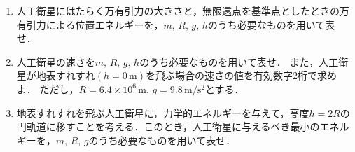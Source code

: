 \begin{enumerate}[（1）]
  \setlength{\leftskip}{-1zw}
  \setlength{\itemindent}{1zw}\setlength{\labelsep}{0.5zw}
  \setlength{\labelwidth}{1zw}\setlength{\leftmargin}{1zw}
  \setlength{\itemsep}{0.5\baselineskip}
  \addtocounter{enumi}{3}
  \item 人工衛星にはたらく万有引力の大きさと，無限遠点を基準点としたときの万有引力による位置エネルギーを，$m,\,R,\,g,\,h$のうち必要なものを用いて表せ．
  \item 人工衛星の速さを$m,\,R,\,g,\,h$のうち必要なものを用いて表せ．
  また，人工衛星が地表すれすれ$(h=0\,\text{m})$を飛ぶ場合の速さの値を有効数字2桁で求めよ．
  ただし，$R=6.4\times 10^6\,\text{m},\,g=9.8\,\text{m}/\text{s}^2$とする．
  \item 地表すれすれを飛ぶ人工衛星に，力学的エネルギーを与えて，高度$h=2R$の円軌道に移すことを考える．このとき，人工衛星に与えるべき最小のエネルギーを，$m,\,R,\,g$のうち必要なものを用いて表せ．
\end{enumerate}

